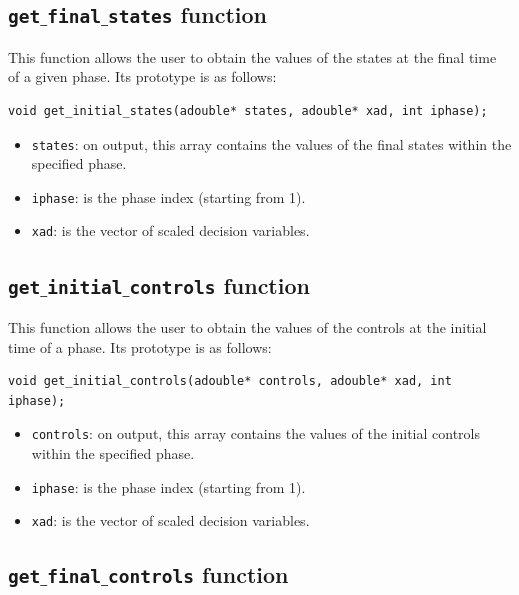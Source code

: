 \documentclass[a4paper,11pt]{report}    %
\begin{document}
\subsection{ \texttt{get$\_$final$\_$states} function}

This function allows the user to obtain the values of the states
at the final time of a given phase. Its prototype is as follows:

\begin{verbatim}
void get_initial_states(adouble* states, adouble* xad, int iphase);
\end{verbatim}

\begin{itemize}
 \item \verb|states|: on output, this array contains the values of the final states within the specified phase.
 \item \verb|iphase|:  is the phase index (starting from 1).
 \item \verb|xad|: is the vector of scaled decision variables.
\end{itemize}




\subsection{ \texttt{get$\_$initial$\_$controls} function}

This function allows the user to obtain the values of the controls
at the initial time of a phase. Its prototype is as follows:

\begin{verbatim}
void get_initial_controls(adouble* controls, adouble* xad, int iphase);
\end{verbatim}


\begin{itemize}
 \item \verb|controls|: on output, this array contains the values of the initial controls within the specified phase.
 \item \verb|iphase|:  is the phase index (starting from 1).
 \item \verb|xad|: is the vector of scaled decision variables.
\end{itemize}



\subsection{ \texttt{get$\_$final$\_$controls} function}
\end{document}
